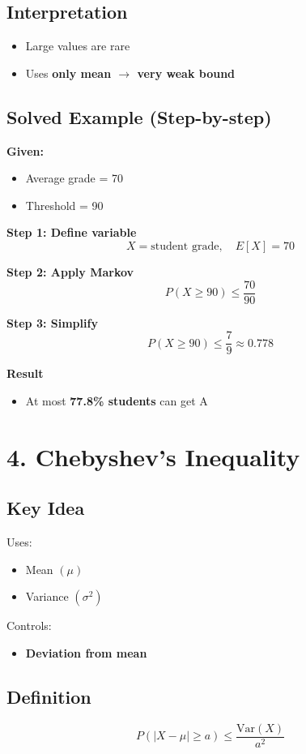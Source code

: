 \documentclass[11pt]{article}
\begin{document}
\subsection*{Interpretation}
\begin{itemize}
\item Large values are rare
\item Uses \textbf{only mean $\rightarrow$ very weak bound}
\end{itemize}

\subsection*{Solved Example (Step-by-step)}

\textbf{Given:}
\begin{itemize}
\item Average grade = 70
\item Threshold = 90
\end{itemize}

\textbf{Step 1: Define variable}
\[
X = \text{student grade}, \quad E[X] = 70
\]

\textbf{Step 2: Apply Markov}
\[
P(X \ge 90) \le \frac{70}{90}
\]

\textbf{Step 3: Simplify}
\[
P(X \ge 90) \le \frac{7}{9} \approx 0.778
\]

\textbf{Result}
\begin{itemize}
\item At most \textbf{77.8\% students} can get A
\end{itemize}

\section*{4. Chebyshev’s Inequality}

\subsection*{Key Idea}
Uses:
\begin{itemize}
\item Mean $(\mu)$
\item Variance $(\sigma^2)$
\end{itemize}

Controls:
\begin{itemize}
\item \textbf{Deviation from mean}
\end{itemize}

\subsection*{Definition}
\[
P(|X - \mu| \ge a) \le \frac{\text{Var}(X)}{a^2}
\]
\end{document}
